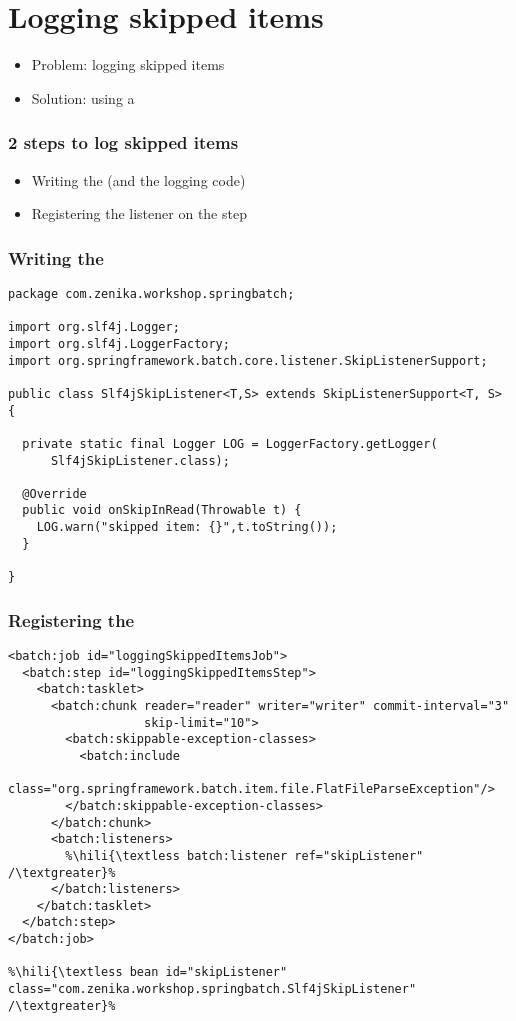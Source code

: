 \section{Logging skipped items}

\begin{frame}
 \begin{itemize}
  \item Problem: logging skipped items
  \item Solution: using a 
 \end{itemize}
\end{frame}

\begin{frame}
 \frametitle{2 steps to log skipped items}
 \begin{itemize}
  \item Writing the  (and the logging code)
  \item Registering the listener on the step  
 \end{itemize}
\end{frame}


\begin{frame}[fragile]
 \frametitle{Writing the }
 \lstset{language=Java}
 \begin{lstlisting}
package com.zenika.workshop.springbatch;

import org.slf4j.Logger;
import org.slf4j.LoggerFactory;
import org.springframework.batch.core.listener.SkipListenerSupport;

public class Slf4jSkipListener<T,S> extends SkipListenerSupport<T, S> {

  private static final Logger LOG = LoggerFactory.getLogger(
      Slf4jSkipListener.class);

  @Override
  public void onSkipInRead(Throwable t) {
    LOG.warn("skipped item: {}",t.toString());
  }

}  
 \end{lstlisting}

\end{frame}


\begin{frame}[fragile]
\frametitle{Registering the }
\lstset{language=XML}
\begin{lstlisting}
<batch:job id="loggingSkippedItemsJob">
  <batch:step id="loggingSkippedItemsStep">
    <batch:tasklet>
      <batch:chunk reader="reader" writer="writer" commit-interval="3"
                   skip-limit="10">
        <batch:skippable-exception-classes>
          <batch:include
           class="org.springframework.batch.item.file.FlatFileParseException"/>
        </batch:skippable-exception-classes>
      </batch:chunk>
      <batch:listeners>
        %\hili{\textless batch:listener ref="skipListener" /\textgreater}%
      </batch:listeners>
    </batch:tasklet>
  </batch:step>
</batch:job>

%\hili{\textless bean id="skipListener" class="com.zenika.workshop.springbatch.Slf4jSkipListener" /\textgreater}%
\end{lstlisting}
\end{frame}

